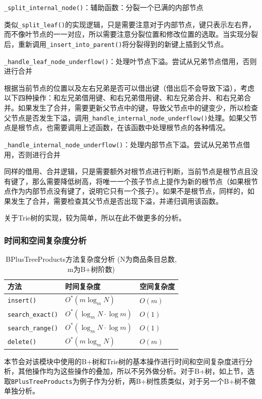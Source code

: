 \documentclass[cn,hazy,blue,10pt,normal]{elegantnote}
\begin{document}
\texttt{\_split\_internal\_node()}：辅助函数：分裂一个已满的内部节点

类似\texttt{\_split\_leaf()}的实现逻辑，只是需要注意对于内部节点，键只表示左右界，而不像叶节点的一一对应，所以需要注意分裂位置和修改位置的选取。当实现分裂后，重新调用\texttt{\_insert\_into\_parent()}将分裂得到的新键上插到父节点。

\texttt{\_handle\_leaf\_node\_underflow()}：处理叶节点下溢。尝试从兄弟节点借用，否则进行合并

根据当前节点的位置以及左右兄弟是否可以借出键（借出后不会导致下溢），考虑以下四种操作：和左兄弟借用键、和右兄弟借用键、和左兄弟合并、和右兄弟合并。如果发生了合并，需要更新父节点中的键，导致父节点中的键变少，所以检查父节点是否发生下溢，调用\texttt{\_handle\_internal\_node\_underflow()}处理。如果父节点是根节点，也需要调用上述函数，在该函数中处理根节点的各种情况。

\texttt{\_handle\_internal\_node\_underflow()}：处理内部节点下溢。尝试从兄弟节点借用，否则进行合并

同样的借用、合并逻辑，只是需要额外对根节点进行判断，当前节点是根节点且没有键了，那么需要降低树高，将唯一一个孩子节点上提作为新的根节点（如果根节点作为内部节点没有键了，说明它只有一个孩子）。如果不是根节点，同样的，如果发生了合并，需要检查其父节点是否出现下溢，并递归调用该函数。

关于Trie树的实现，较为简单，所以在此不做更多的分析。


\subsubsection{时间和空间复杂度分析}
\begin{table}[t]
    \centering
    \caption{BPlusTreeProducts方法复杂度分析 (N为商品条目总数, m为B+树阶数)}
    \label{tab: bplustree_complexity}
    \begin{tabular}{lll}
    \toprule
    方法& 时间复杂度& 空间复杂度 \\
    \midrule
    \texttt{insert()} & $O^*(m \log_m N)$ & $O(m)$ \\
    \texttt{search\_exact()} & $O^*(\log_m N \cdot \log m)$ & $O(1)$ \\
    \texttt{search\_range()} & $O^*(\log_m N \cdot \log m)$ & $O(1)$ \\
    \texttt{delete()} & $O^*(m \log_m N )$ & $O(m)$ \\
    \bottomrule
    \end{tabular}
\end{table}
本节会对该模块中使用的B+树和Trie树的基本操作进行时间和空间复杂度进行分析，其他操作均为这些操作的叠加，所以不另外做分析。对于B+树，如上节，选取\texttt{BPlusTreeProducts}为例子作为分析，两B+树性质类似，对于另一个B+树不做单独分析。
\end{document}
